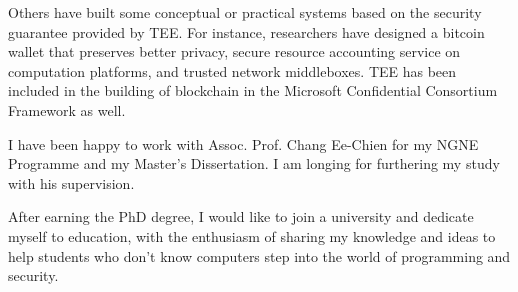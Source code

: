 \documentclass[11pt, a4paper]{awesome-cv}
\begin{document}
\begin{cvletter}
    Others have built some conceptual or practical systems based on the security guarantee provided by TEE.
    For instance, researchers have designed a bitcoin wallet that preserves better privacy, secure resource accounting service on computation platforms, and trusted network middleboxes.
    TEE has been included in the building of blockchain in the Microsoft Confidential Consortium Framework as well.


    I have been happy to work with Assoc. Prof. Chang Ee-Chien for my NGNE Programme and my Master's Dissertation.
    I am longing for furthering my study with his supervision.




    After earning the PhD degree, I would like to join a university and dedicate myself to education, with the enthusiasm of sharing my knowledge and ideas to help students who don't know computers step into the world of programming and security.

\end{cvletter}
\end{document}
